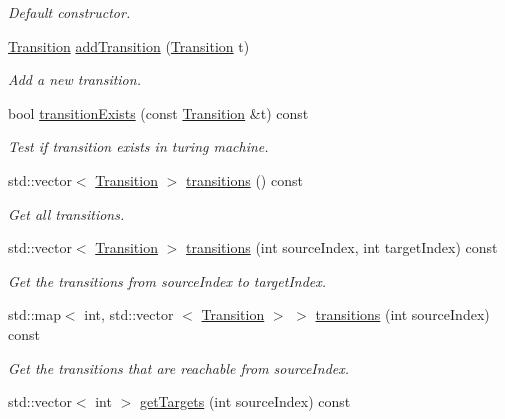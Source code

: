 \begin{DoxyCompactItemize}
\begin{DoxyCompactList}\small\item\em \-Default constructor. \end{DoxyCompactList}\item 
\hyperlink{classtum_1_1_transition}{\-Transition} \hyperlink{classtum_1_1_turing_machine_ac3e8f92c33549ade6cb5497a095b237e}{add\-Transition} (\hyperlink{classtum_1_1_transition}{\-Transition} t)
\begin{DoxyCompactList}\small\item\em \-Add a new transition. \end{DoxyCompactList}\item 
bool \hyperlink{classtum_1_1_turing_machine_af2cc74f42a7bcb680c57186a426a128a}{transition\-Exists} (const \hyperlink{classtum_1_1_transition}{\-Transition} \&t) const 
\begin{DoxyCompactList}\small\item\em \-Test if transition exists in turing machine. \end{DoxyCompactList}\item 
std\-::vector$<$ \hyperlink{classtum_1_1_transition}{\-Transition} $>$ \hyperlink{classtum_1_1_turing_machine_a2bf271c9bf23e40c6157f414e4dd8b4d}{transitions} () const 
\begin{DoxyCompactList}\small\item\em \-Get all transitions. \end{DoxyCompactList}\item 
std\-::vector$<$ \hyperlink{classtum_1_1_transition}{\-Transition} $>$ \hyperlink{classtum_1_1_turing_machine_a84d6694e13b96b360ad3d49be7bb7bbf}{transitions} (int source\-Index, int target\-Index) const 
\begin{DoxyCompactList}\small\item\em \-Get the transitions from {\ttfamily source\-Index} to {\ttfamily target\-Index}. \end{DoxyCompactList}\item 
std\-::map$<$ int, std\-::vector\*
$<$ \hyperlink{classtum_1_1_transition}{\-Transition} $>$ $>$ \hyperlink{classtum_1_1_turing_machine_a67b5d2ba23ee50f1b672b32726379ab1}{transitions} (int source\-Index) const 
\begin{DoxyCompactList}\small\item\em \-Get the transitions that are reachable from {\ttfamily source\-Index}. \end{DoxyCompactList}\item 
std\-::vector$<$ int $>$ \hyperlink{classtum_1_1_turing_machine_a4f2e974eb2fe43783587dcaa6344e0cc}{get\-Targets} (int source\-Index) const 

\end{DoxyCompactItemize}
